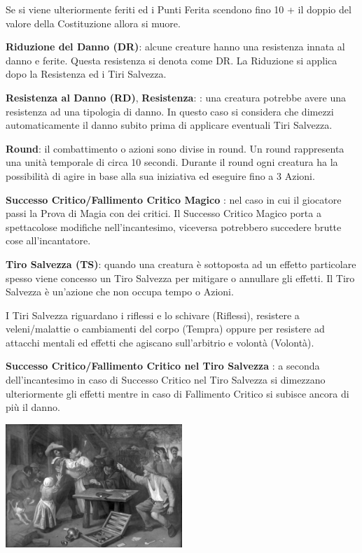 \begin{multicols}{2}
Se si viene ulteriormente feriti ed i Punti Ferita scendono fino 10 + il doppio del valore della Costituzione allora si muore.

\textbf{Riduzione del Danno (DR)}:   alcune creature hanno una resistenza innata al danno e ferite. Questa resistenza si denota come DR. La Riduzione si applica dopo la Resistenza ed i Tiri Salvezza.

\textbf{Resistenza al Danno (RD)}, \textbf{Resistenza}: : una creatura potrebbe avere una resistenza ad una tipologia di danno. In questo caso si considera che dimezzi automaticamente il danno subito prima di applicare eventuali Tiri Salvezza.

\textbf{Round}: il combattimento o azioni sono divise in round. Un round rappresenta una unità temporale di circa 10 secondi. Durante il round ogni creatura ha la possibilità di agire in base alla sua iniziativa ed eseguire fino a 3 Azioni.

\textbf{Successo Critico/Fallimento Critico Magico} : nel caso in cui il giocatore passi la Prova di Magia con dei critici. Il Successo Critico Magico porta a spettacolose modifiche nell'incantesimo, viceversa potrebbero succedere brutte cose all'incantatore.

\textbf{Tiro Salvezza (TS)}: quando una creatura è sottoposta ad un effetto particolare spesso viene concesso un Tiro Salvezza per mitigare o annullare gli effetti. Il Tiro Salvezza è un'azione che non occupa tempo o Azioni.

I Tiri Salvezza riguardano i riflessi e lo schivare (Riflessi), resistere a veleni/malattie o cambiamenti del corpo (Tempra) oppure per resistere ad attacchi mentali ed effetti che agiscano sull'arbitrio e volontà (Volontà).

\textbf{Successo Critico/Fallimento Critico nel Tiro Salvezza} : a seconda dell'incantesimo in caso di Successo Critico nel Tiro Salvezza si dimezzano ulteriormente gli effetti mentre in caso di Fallimento Critico si subisce ancora di più il danno.

\begin{center}
\includegraphics[width=0.5\textwidth]{immagini/Jan_Steen2.png}


\end{center}
\end{multicols}
